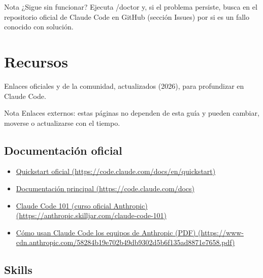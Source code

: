 \documentclass[11pt,a4paper]{report}
\begin{document}
\begin{calloutbox}{Nota}
¿Sigue sin funcionar? Ejecuta /doctor y, si el problema persiste, busca en el repositorio oficial de Claude Code en GitHub (sección Issues) por si es un fallo conocido con solución.\end{calloutbox}


\chapter{Recursos}

Enlaces oficiales y de la comunidad, actualizados (2026), para profundizar en Claude Code.

\begin{calloutbox}{Nota}
Enlaces externos: estas páginas no dependen de esta guía y pueden cambiar, moverse o actualizarse con el tiempo.\end{calloutbox}

\section{Documentación oficial}

\begin{itemize}
\item \href{https://code.claude.com/docs/en/quickstart}{Quickstart oficial (\url{https://code.claude.com/docs/en/quickstart})}
\item \href{https://code.claude.com/docs}{Documentación principal (\url{https://code.claude.com/docs})}
\item \href{https://anthropic.skilljar.com/claude-code-101}{Claude Code 101 (curso oficial Anthropic) (\url{https://anthropic.skilljar.com/claude-code-101})}
\item \href{https://www-cdn.anthropic.com/58284b19e702b49db9302d5b6f135ad8871e7658.pdf}{Cómo usan Claude Code los equipos de Anthropic (PDF) (\url{https://www-cdn.anthropic.com/58284b19e702b49db9302d5b6f135ad8871e7658.pdf})}
\end{itemize}

\section{Skills}
\end{document}

